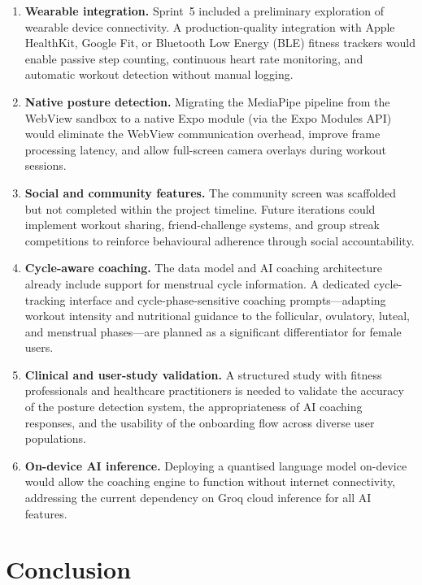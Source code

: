 \begin{enumerate}
	\item \textbf{Wearable integration.} Sprint~5 included a preliminary
	exploration of wearable device connectivity. A production-quality
	integration with Apple HealthKit, Google Fit, or Bluetooth Low Energy
	(BLE) fitness trackers would enable passive step counting, continuous
	heart rate monitoring, and automatic workout detection without manual
	logging.
	
	\item \textbf{Native posture detection.} Migrating the MediaPipe
	pipeline from the WebView sandbox to a native Expo module (via the
	Expo Modules API) would eliminate the WebView communication overhead,
	improve frame processing latency, and allow full-screen camera overlays
	during workout sessions.
	
	\item \textbf{Social and community features.} The community screen was
	scaffolded but not completed within the project timeline. Future
	iterations could implement workout sharing, friend-challenge systems,
	and group streak competitions to reinforce behavioural adherence
	through social accountability.
	
	\item \textbf{Cycle-aware coaching.} The data model and AI coaching
	architecture already include support for menstrual cycle information.
	A dedicated cycle-tracking interface and cycle-phase-sensitive coaching
	prompts---adapting workout intensity and nutritional guidance to the
	follicular, ovulatory, luteal, and menstrual phases---are planned as
	a significant differentiator for female users.
	
	\item \textbf{Clinical and user-study validation.} A structured study
	with fitness professionals and healthcare practitioners is needed to
	validate the accuracy of the posture detection system, the
	appropriateness of AI coaching responses, and the usability of the
	onboarding flow across diverse user populations.
	
	\item \textbf{On-device AI inference.} Deploying a quantised language
	model on-device would allow the coaching engine to function without
	internet connectivity, addressing the current dependency on Groq cloud
	inference for all AI features.
\end{enumerate}

\section{Conclusion}

